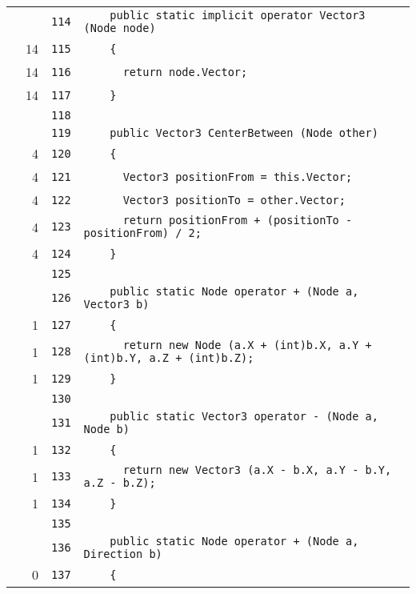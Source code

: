 \documentclass[a4paper,10pt]{article}
\begin{document}
\begin{longtable}[l]{lrrl}
\cellcolor{gray} &  & \verb~114~ & \verb~    public static implicit operator Vector3 (Node node)~\\
\cellcolor{green} & 14 & \verb~115~ & \verb~    {~\\
\cellcolor{green} & 14 & \verb~116~ & \verb~      return node.Vector;~\\
\cellcolor{green} & 14 & \verb~117~ & \verb~    }~\\
\cellcolor{gray} &  & \verb~118~ & \verb~~\\
\cellcolor{gray} &  & \verb~119~ & \verb~    public Vector3 CenterBetween (Node other)~\\
\cellcolor{green} & 4 & \verb~120~ & \verb~    {~\\
\cellcolor{green} & 4 & \verb~121~ & \verb~      Vector3 positionFrom = this.Vector;~\\
\cellcolor{green} & 4 & \verb~122~ & \verb~      Vector3 positionTo = other.Vector;~\\
\cellcolor{green} & 4 & \verb~123~ & \verb~      return positionFrom + (positionTo - positionFrom) / 2;~\\
\cellcolor{green} & 4 & \verb~124~ & \verb~    }~\\
\cellcolor{gray} &  & \verb~125~ & \verb~~\\
\cellcolor{gray} &  & \verb~126~ & \verb~    public static Node operator + (Node a, Vector3 b)~\\
\cellcolor{green} & 1 & \verb~127~ & \verb~    {~\\
\cellcolor{green} & 1 & \verb~128~ & \verb~      return new Node (a.X + (int)b.X, a.Y + (int)b.Y, a.Z + (int)b.Z);~\\
\cellcolor{green} & 1 & \verb~129~ & \verb~    }~\\
\cellcolor{gray} &  & \verb~130~ & \verb~~\\
\cellcolor{gray} &  & \verb~131~ & \verb~    public static Vector3 operator - (Node a, Node b)~\\
\cellcolor{green} & 1 & \verb~132~ & \verb~    {~\\
\cellcolor{green} & 1 & \verb~133~ & \verb~      return new Vector3 (a.X - b.X, a.Y - b.Y, a.Z - b.Z);~\\
\cellcolor{green} & 1 & \verb~134~ & \verb~    }~\\
\cellcolor{gray} &  & \verb~135~ & \verb~~\\
\cellcolor{gray} &  & \verb~136~ & \verb~    public static Node operator + (Node a, Direction b)~\\
\cellcolor{red} & 0 & \verb~137~ & \verb~    {~\\

\end{longtable}
\end{document}
